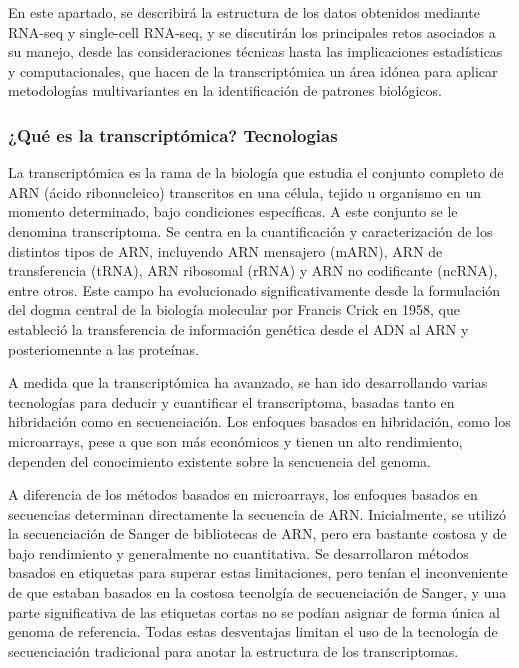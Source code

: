 En este apartado, se describirá la estructura de los datos obtenidos mediante RNA-seq y single-cell RNA-seq, y se discutirán los 
principales retos asociados a su manejo, desde las consideraciones técnicas hasta las implicaciones estadísticas y computacionales, 
que hacen de la transcriptómica un área idónea para aplicar metodologías multivariantes en la identificación de patrones biológicos.

\subsubsection{¿Qué es la transcriptómica? Tecnologias}

La transcriptómica es la rama de la biología que estudia el conjunto completo de ARN (ácido ribonucleico) transcritos en una
célula, tejido u organismo en un momento determinado, bajo condiciones específicas. A este conjunto se le denomina transcriptoma. Se centra en la cuantificación y caracterización
de los distintos tipos de ARN, incluyendo ARN mensajero (mARN), ARN de transferencia (tRNA), ARN ribosomal (rRNA) y ARN 
no codificante (ncRNA), entre otros. Este campo ha evolucionado significativamente desde la formulación del dogma central de la biología molecular por Francis Crick
en 1958, que estableció la transferencia de información genética desde el ADN al ARN y posteriomennte a las proteínas. \newline

A medida que la transcriptómica ha avanzado, se han ido desarrollando varias tecnologías para deducir y cuantificar el transcriptoma, basadas
tanto en hibridación como en secuenciación. Los enfoques basados en hibridación, como los microarrays, pese a que son más económicos y 
tienen un alto rendimiento, dependen del conocimiento existente sobre la sencuencia del genoma. \newline

A diferencia de los métodos basados en microarrays, los enfoques basados en secuencias determinan directamente la secuencia de ARN. Inicialmente, se utilizó
la secuenciación de Sanger de bibliotecas de ARN, pero era bastante costosa y de bajo rendimiento y generalmente no cuantitativa. Se 
desarrollaron métodos basados en etiquetas para superar estas limitaciones, pero tenían el inconveniente de que estaban basados en la 
costosa tecnolgía de secuenciación de Sanger, y una parte significativa de las etiquetas cortas no se podían asignar de forma única al
genoma de referencia. Todas estas desventajas limitan el uso de la tecnología de secuenciación tradicional para anotar la estructura de los 
transcriptomas. \newline

